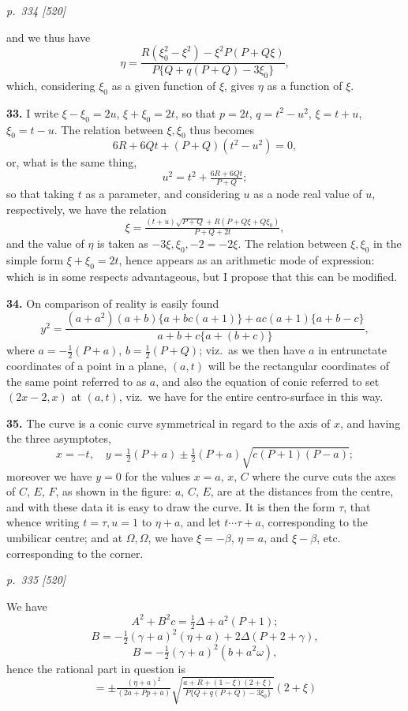 \documentclass[11pt,a4paper]{article}
\theoremstyle{plain}
\theoremstyle{definition}
\begin{document}
\bigskip
\textit{p.~334 [520]}
\smallskip

and we thus have
\[
\eta = \frac{R(\xi_0^2 - \xi^2) - \xi^2 P(P + Q\xi)}{P\{Q + q(P + Q) - 3\xi_0\}},
\]
which, considering $\xi_0$ as a given function of $\xi$, gives $\eta$ as a function of $\xi$.

\textbf{33.} I write $\xi - \xi_0 = 2u$, $\xi + \xi_0 = 2t$, so that $p = 2t$, $q = t^2 - u^2$, $\xi = t + u$, $\xi_0 = t - u$. The relation between $\xi, \xi_0$ thus becomes
\[
6R + 6Qt + (P + Q)(t^2 - u^2) = 0,
\]
or, what is the same thing,
\[
u^2 = t^2 + \tfrac{6R + 6Qt}{P + Q};
\]
so that taking $t$ as a parameter, and considering $u$ as a node real value of $u$, respectively, we have the relation
\[
\xi = \tfrac{(t + u)\sqrt{P + Q} + R(P + Q\xi + Q\xi_0)}{P + Q + 2t},
\]
and the value of $\eta$ is taken as $-3\xi, \xi_0, -2 = -2\xi$. The relation between $\xi, \xi_0$ in the simple form $\xi + \xi_0 = 2t$, hence appears as an arithmetic mode of expression: which is in some respects advantageous, but I propose that this can be modified.

\textbf{34.} On comparison of reality is easily found
\[
y^2 = \frac{(a + a^2)(a + b)\{a + bc(a + 1)\} + a c(a + 1)\{a + b - c\}}{a + b + c\{a + (b + c)\}},
\]
where $a = -\tfrac{1}{2}(P + a)$, $b = \tfrac{1}{2}(P + Q)$; viz.\ as we then have $a$ in entrunctate coordinates of a point in a plane, $(a, t)$ will be the rectangular coordinates of the same point referred to as $a$, and also the equation of conic referred to set $(2x - 2, x)$ at $(a, t)$, viz.\ we have for the entire centro-surface in this way.

\textbf{35.} The curve is a conic curve symmetrical in regard to the axis of $x$, and having the three asymptotes,
\[
x = -t,\quad y = \tfrac{1}{2}(P + a) \pm \tfrac{1}{2}(P + a)\sqrt{c(P + 1)(P - a)};
\]
moreover we have $y = 0$ for the values $x = a$, $x$, $C$ where the curve cuts the axes of $C$, $E$, $F$, as shown in the figure: $a$, $C$, $E$, are at the distances from the centre, and with these data it is easy to draw the curve. It is then the form $\tau$, that whence writing $t = \tau, u = 1$ to $\eta + a$, and let $t \cdots \tau + a$, corresponding to the umbilicar centre; and at $\Omega, \Omega$, we have $\xi = -\beta$, $\eta = a$, and $\xi - \beta$, etc. corresponding to the corner.

\clearpage

\bigskip
\textit{p.~335 [520]}
\smallskip

We have
\[
A^2 + B^2 c = \tfrac{1}{2}\Delta + a^2(P + 1);
\]
\[
B = -\tfrac{1}{2}(\gamma + a)^2(\eta + a) + 2\Delta(P + 2 + \gamma),
\]
\[
B = -\tfrac{1}{2}(\gamma + a)^2(b + a^2 \omega),
\]
hence the rational part in question is
\[
= \pm \tfrac{(\eta + a)^2}{(2a + Pp + a)}\sqrt{\tfrac{a + R + (1 - \xi)(2 + \xi)}{P\{Q + q(P + Q) - 3\xi_0\}}}(2 + \xi)
\]
\end{document}
